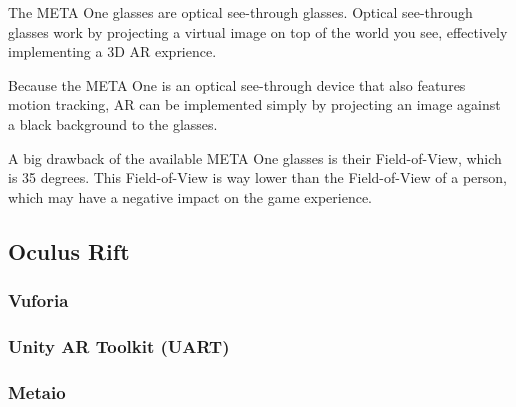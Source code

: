 			The META One glasses are optical see-through glasses. Optical 
			see-through glasses work by projecting a virtual image on top of the
			world you see, effectively implementing a 3D AR exprience.
			
			Because the META One is an optical see-through device that also 
			features motion tracking, AR can be implemented simply by 
			projecting an image against a black background to the glasses.
			
			A big drawback of the available META One glasses is their 
			Field-of-View, which is 35 degrees. This Field-of-View is way lower
			than the Field-of-View of a person, which may have a negative impact 
			on the game experience.
			
		\subsection{Oculus Rift} \label{ssec:oculusrift}
			\subsubsection{Vuforia} \label{sssec:vuforia}
			\subsubsection{Unity AR Toolkit (UART)} \label{sssec:uart}
			\subsubsection{Metaio} \label{sssec:metaio}
	
